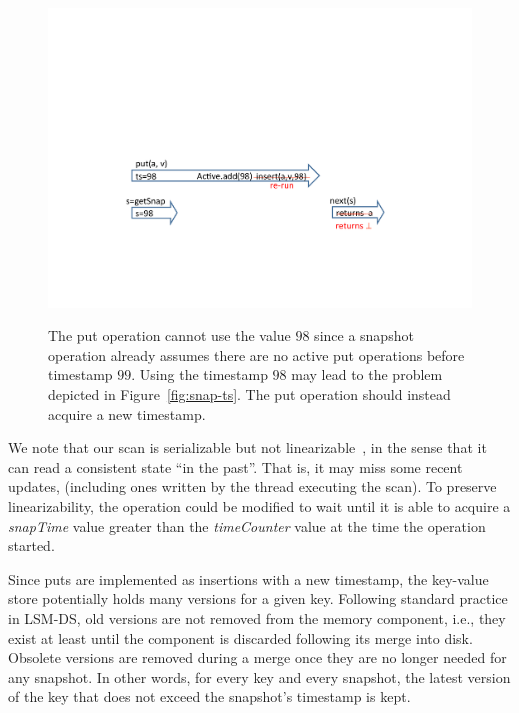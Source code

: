 \begin{figure}[t]
\center
		{\includegraphics[width=\columnwidth, clip, trim=100 150 100
		300]{Figures/example3}}

		\caption{The put operation cannot use the value $98$ since a
		snapshot operation already assumes there are no active put operations
		before timestamp $99$. Using the timestamp $98$ may lead to the problem
		depicted in Figure~\ref{fig:snap-ts}. The put operation should instead
		acquire a new timestamp.}
  \label{fig:race}
\end{figure}

We note that our scan is serializable but not linearizable~\cite{Herlihy:1990}, in the sense that it can read a consistent state ``in the past''.
That is, it may miss some recent updates,
(including ones written by the thread executing the scan). To preserve
linearizability, the  operation could be modified to wait until it is able
to acquire a \emph{snapTime} value greater than the  \emph{timeCounter}
value at the time the operation started. 

Since puts are implemented as insertions with a new timestamp, the key-value store potentially holds many versions for a given key.
Following standard practice in LSM-DS,
old versions are not removed from the memory component, i.e., they exist at least until the component is discarded following its merge into disk.
Obsolete versions are removed during a merge once they are no longer needed for any snapshot.
In other words, for every key and every snapshot, the latest version of the key
that does not exceed the snapshot's timestamp is kept. %

